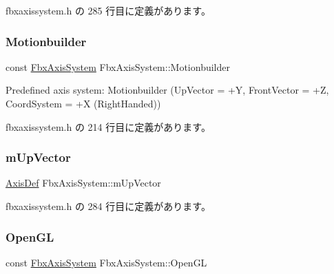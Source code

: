  fbxaxissystem.\+h の 285 行目に定義があります。

\mbox{\label{class_fbx_axis_system_af24f958db3b4147d22005984cd4cebb2}} 
\subsubsection{\texorpdfstring{Motionbuilder}{Motionbuilder}}
{\footnotesize\ttfamily const \hyperlink{class_fbx_axis_system}{Fbx\+Axis\+System} Fbx\+Axis\+System\+::\+Motionbuilder\hspace{0.3cm}{\ttfamily [static]}}



Predefined axis system\+: Motionbuilder (Up\+Vector = +Y, Front\+Vector = +Z, Coord\+System = +X (Right\+Handed)) 



 fbxaxissystem.\+h の 214 行目に定義があります。

\mbox{\label{class_fbx_axis_system_afdefd4d8b257567fe099e28dd1745cfe}} 
\subsubsection{\texorpdfstring{m\+Up\+Vector}{mUpVector}}
{\footnotesize\ttfamily \hyperlink{class_fbx_axis_system_1_1_axis_def}{Axis\+Def} Fbx\+Axis\+System\+::m\+Up\+Vector\hspace{0.3cm}{\ttfamily [protected]}}



 fbxaxissystem.\+h の 284 行目に定義があります。

\mbox{\label{class_fbx_axis_system_a30249cc37f848cdac27b77d3520f4e28}} 
\subsubsection{\texorpdfstring{Open\+GL}{OpenGL}}
{\footnotesize\ttfamily const \hyperlink{class_fbx_axis_system}{Fbx\+Axis\+System} Fbx\+Axis\+System\+::\+Open\+GL\hspace{0.3cm}{\ttfamily [static]}}



